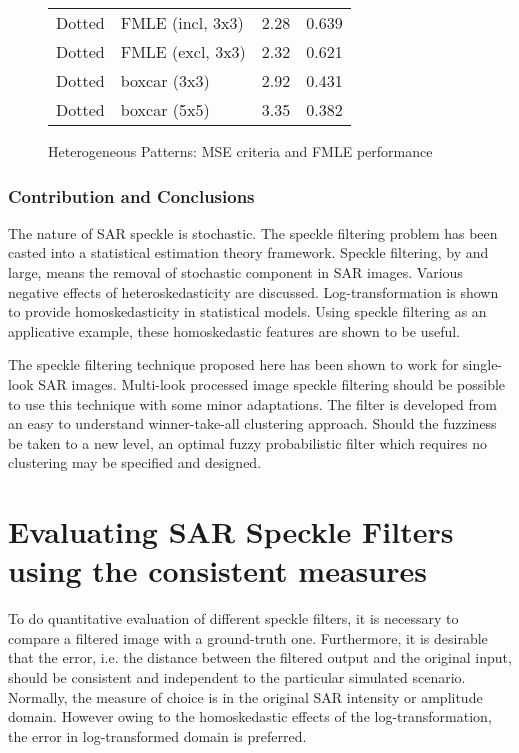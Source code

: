 \begin{figure}[h!]
\begin{minipage}[c]{0.38\textwidth}
\begin{tabular}{|l|l|l|l|}
\hline
Dotted 			& FMLE (incl, 3x3) 	& 2.28	& 0.639 \\
Dotted 			& FMLE (excl, 3x3) 	& 2.32	& 0.621 \\
Dotted 			& boxcar (3x3) 			& 2.92	& 0.431 \\
Dotted 			& boxcar (5x5) 			& 3.35	& 0.382 \\
\hline
\end{tabular}
\end{minipage}
\caption{Heterogeneous Patterns: MSE criteria and FMLE performance}
\label{fig:Heterogeneous_Patterns}
\end{figure}

\subsubsection{Contribution and Conclusions}

The nature of SAR speckle is stochastic. 
The speckle filtering problem has been casted into a statistical estimation theory framework. 
Speckle filtering, by and large, means the removal of stochastic component in SAR images. 
Various negative effects of heteroskedasticity are discussed. 
Log-transformation is shown to provide homoskedasticity in statistical models. 
Using speckle filtering as an applicative example, these homoskedastic features are shown to be useful. %

The speckle filtering technique proposed here has been shown to work for single-look SAR images. 
Multi-look processed image speckle filtering should be possible to use this technique with some minor adaptations. 
The filter is developed from an easy to understand winner-take-all clustering approach. %
Should the fuzziness be taken to a new level, an optimal fuzzy probabilistic filter which requires no clustering may be specified and designed.

\section{Evaluating SAR Speckle Filters using the consistent measures}

To do quantitative evaluation of different speckle filters, it is necessary to compare a filtered image with a ground-truth one. 
Furthermore, it is desirable that the error, i.e. the distance between the filtered output and the original input, should be consistent and independent to the particular simulated scenario. 
Normally, the measure of choice is in the original SAR intensity or amplitude domain. 
However owing to the homoskedastic effects of the log-transformation, the error in log-transformed domain is preferred.  

